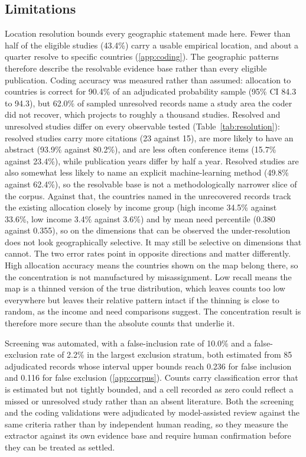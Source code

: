 \documentclass[ASNA,twocolumn]{USG}
\begin{document}
\subsection{Limitations}

Location resolution bounds every geographic statement made here. Fewer than half of the
eligible studies (43.4\%) carry a usable empirical location, and about a quarter resolve to
specific countries (\ref{app:coding}). The geographic patterns therefore describe the resolvable
evidence base rather than every eligible publication. Coding accuracy was measured rather than
assumed: allocation to countries is correct for 90.4\% of an adjudicated probability sample
(95\% CI 84.3 to 94.3), but 62.0\% of sampled unresolved records name a study area the coder did
not recover, which projects to roughly a thousand studies. Resolved and unresolved studies differ on every observable tested (Table~\ref{tab:resolution}):
resolved studies carry more citations (23 against 15), are more likely to have an abstract
(93.9\% against 80.2\%), and are less often conference items (15.7\% against 23.4\%), while
publication years differ by half a year. Resolved studies are also somewhat less likely to name
an explicit machine-learning method (49.8\% against 62.4\%), so the resolvable base is not a
methodologically narrower slice of the corpus. Against that, the countries named in the unrecovered records track the existing allocation closely
by income group (high income 34.5\% against 33.6\%, low income 3.4\% against 3.6\%) and by mean
need percentile (0.380 against 0.355), so on the dimensions that can be observed the
under-resolution does not look geographically selective. It may still be selective on dimensions
that cannot. The two error rates point in opposite directions and matter differently. High
allocation accuracy means the countries shown on the map belong there, so the concentration is not
manufactured by misassignment. Low recall means the map is a thinned version of the true
distribution, which leaves counts too low everywhere but leaves their relative pattern intact if
the thinning is close to random, as the income and need comparisons suggest. The concentration
result is therefore more secure than the absolute counts that underlie it.

Screening was automated, with a false-inclusion rate of 10.0\% and a false-exclusion rate of
2.2\% in the largest exclusion stratum, both estimated from 85 adjudicated records whose interval upper bounds reach 0.236 for false
inclusion and 0.116 for false exclusion (\ref{app:corpus}). Counts carry
classification error that is estimated but not tightly bounded, and a cell recorded as zero could
reflect a missed or unresolved study rather than an absent literature. Both the screening and the
coding validations were adjudicated by model-assisted review against the same criteria rather
than by independent human reading, so they measure the extractor against its own evidence base
and require human confirmation before they can be treated as settled.
\end{document}
